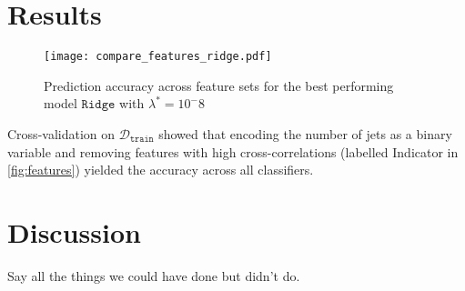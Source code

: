 \documentclass[10pt,conference,compsocconf]{IEEEtran}
\newcommand{\Dtrain}{\mathcal{D}_{\mathtt{train}}}
\newcommand{\Ridge}{\mathtt{Ridge}}
\begin{document}
\section{Results}
\label{sec:results}

\begin{figure}
	\texttt{[image: compare\_features\_ridge.pdf]}
	\caption{Prediction accuracy across feature sets for the best performing model $\Ridge$ with $\lambda^* = 10^-8$}
	\label{fig:features}
	\vspace*{-5mm}
	\setlength{\belowcaptionskip}{-10pt}
\end{figure}

Cross-validation on $\Dtrain$ showed that encoding the number of jets as a binary variable and removing features with high cross-correlations (labelled Indicator in \autoref{fig:features}) yielded the accuracy across all classifiers. 



\section{Discussion}
Say all the things we could have done but didn't do.



\end{document}
